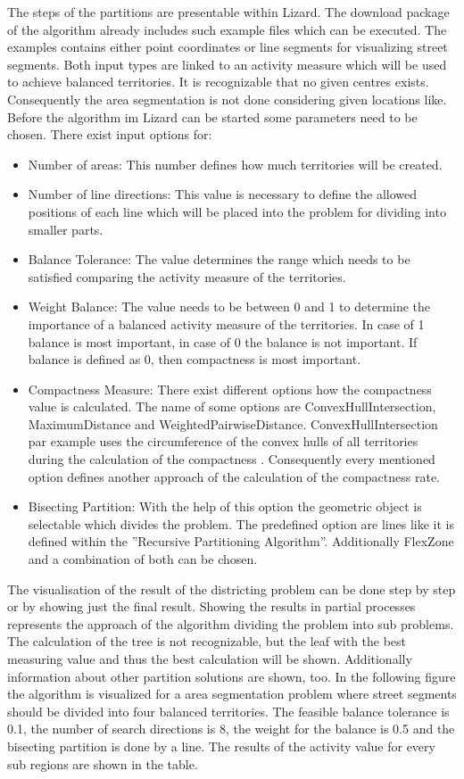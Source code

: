 The steps of the partitions are presentable within Lizard. The download package of the algorithm already includes such example files which can be executed. The examples contains either point coordinates or line segments for visualizing street segments. Both input types are linked to an activity measure which will be used to achieve balanced territories. It is recognizable that no given centres exists. Consequently the area segmentation is not done considering given locations like. Before the algorithm im Lizard can be started some parameters need to be chosen. There exist input options for:
\begin{itemize}
	\item Number of areas: This number defines how much territories will be created.
	\item Number of line directions: This value is necessary to define the allowed positions of each line which will be placed into the problem for dividing into smaller parts.
	\item Balance Tolerance: The value determines the range which needs to be satisfied comparing the activity measure of the territories.
	\item Weight Balance: The value needs to be between 0 and 1 to determine the importance of a balanced activity measure of the territories. In case of 1 balance is most important, in case of 0 the balance is not important. If balance is defined as 0, then compactness is most important.
	\item Compactness Measure: There exist different options how the compactness value is calculated. The name of some options are ConvexHullIntersection, MaximumDistance and WeightedPairwiseDistance. ConvexHullIntersection par example uses the circumference of the convex hulls of all territories during the calculation of the compactness \cite{kit_lizard}. Consequently every mentioned option defines another approach of the calculation of the compactness rate.
	\item Bisecting Partition: With the help of this option the geometric object is selectable which divides the problem. The predefined option are lines like it is defined within the ''Recursive Partitioning Algorithm''. Additionally FlexZone and a combination of both can be chosen.
\end{itemize}

The visualisation of the result of the districting problem can be done step by step or by showing just the final result. Showing the results in partial processes represents the approach of the algorithm dividing the problem into sub problems. The calculation of the tree is not recognizable, but the leaf with the best measuring value and thus the best calculation will be shown. Additionally information about other partition solutions are shown, too. In the following figure the algorithm is visualized for a area segmentation problem where street segments should be divided into four balanced territories. The feasible balance tolerance is 0.1, the number of search directions is 8, the weight for the balance is 0.5 and the bisecting partition is done by a line. The results of the activity value for every sub regions are shown in the table.


